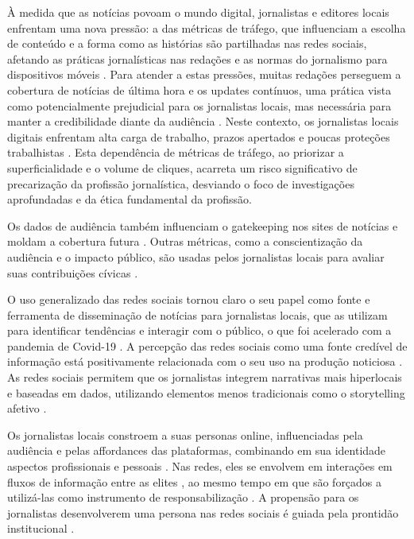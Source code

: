 \documentclass[portuguese]{textolivre}
\begin{document}
À medida que as notícias povoam o mundo digital, jornalistas e editores locais enfrentam uma nova pressão: a das métricas de tráfego, que influenciam a escolha de conteúdo e a forma como as histórias são partilhadas nas redes sociais, afetando as práticas jornalísticas nas redações e as normas do jornalismo para dispositivos móveis \cite{blanchettneheli2018, perreault2019}. Para atender a estas pressões, muitas redações perseguem a cobertura de notícias de última hora e os updates contínuos, uma prática vista como potencialmente prejudicial para os jornalistas locais, mas necessária para manter a credibilidade diante da audiência \cite{usher2018}. Neste contexto, os jornalistas locais digitais enfrentam alta carga de trabalho, prazos apertados e poucas proteções trabalhistas \cite{higginsdobney2021}. Esta dependência de métricas de tráfego, ao priorizar a superficialidade e o volume de cliques, acarreta um risco significativo de precarização da profissão jornalística, desviando o foco de investigações aprofundadas e da ética fundamental da profissão.

Os dados de audiência também influenciam o gatekeeping nos sites de notícias e moldam a cobertura futura \cite{blanchett2021}. Outras métricas, como a conscientização da audiência e o impacto público, são usadas pelos jornalistas locais para avaliar suas contribuições cívicas \cite{powers2018}.

O uso generalizado das redes sociais tornou claro o seu papel como fonte e ferramenta de disseminação de notícias para jornalistas locais, que as utilizam para identificar tendências e interagir com o público, o que foi acelerado com a pandemia de Covid-19 \cite{zhang2022}. A percepção das redes sociais como uma fonte credível de informação está positivamente relacionada com o seu uso na produção noticiosa \cite{zhang2020}. As redes sociais permitem que os jornalistas integrem narrativas mais hiperlocais e baseadas em dados, utilizando elementos menos tradicionais como o storytelling afetivo \cite{chen2023}.

Os jornalistas locais constroem a suas personas online, influenciadas pela audiência e pelas affordances das plataformas, combinando em sua identidade aspectos profissionais e pessoais \cite{baftiu2023}. Nas redes, eles se envolvem em interações em fluxos de informação entre as elites \cite{habel2018}, ao mesmo tempo em que são forçados a utilizá-las como instrumento de responsabilização \cite{slavtchevapetkova2016}. A propensão para os jornalistas desenvolverem uma persona nas redes sociais é guiada pela prontidão institucional \cite{hamzah2020}. 
\end{document}
